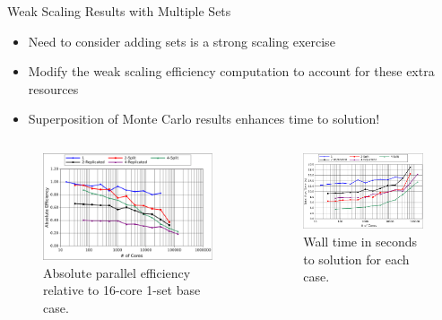 \documentclass{beamer}
\begin{document}
\begin{frame}{Weak Scaling Results with Multiple Sets}

  \begin{itemize}
  \item Need to consider adding sets is a strong scaling exercise
  \item Modify the weak scaling efficiency computation to account for
    these extra resources
  \item Superposition of Monte Carlo results enhances time to solution!
  \end{itemize}

  \begin{columns}
    \begin{column}{0.5\textwidth}

      \begin{figure}[htpb!]
        \begin{center}
          \includegraphics[width=2.4in]{titan_weak_ms_eff.pdf}
        \end{center}
        \caption{Absolute parallel efficiency relative to 16-core
          1-set base case.}
      \end{figure}

    \end{column}

    \begin{column}{0.5\textwidth}

      \begin{figure}[htpb!]
        \begin{center}
          \includegraphics[width=2.4in]{titan_weak_ms_time.pdf}
        \end{center}
        \caption{Wall time in seconds to solution for each case.}
      \end{figure}

    \end{column}
  \end{columns}

\end{frame}
\end{document}
